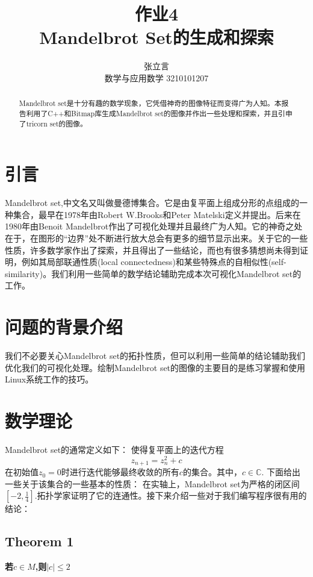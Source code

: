 \documentclass{ctexart}
\begin{document}
\title{作业4\\Mandelbrot Set的生成和探索}
\author{张立言\\数学与应用数学 3210101207}
\maketitle

\begin{abstract}
Mandelbrot set是十分有趣的数学现象，它凭借神奇的图像特征而变得广为人知。本报告利用了C++和Bitmap库生成Mandelbrot set的图像并作出一些处理和探索，并且引申了tricorn set的图像。

\end{abstract}
\section{引言}
Mandelbrot set,中文名又叫做曼德博集合。它是由复平面上组成分形的点组成的一种集合，最早在1978年由Robert W.Brooks和Peter Matelski定义并提出。后来在1980年由Benoit Mandelbrot作出了可视化处理并且最终广为人知\cite{aa}。它的神奇之处在于，在图形的“边界”处不断进行放大总会有更多的细节显示出来。关于它的一些性质，许多数学家作出了探索，并且得出了一些结论，而也有很多猜想尚未得到证明，例如其局部联通性质(local connectedness)和某些特殊点的自相似性(self-similarity)。我们利用一些简单的数学结论辅助完成本次可视化Mandelbrot set的工作。

\section{问题的背景介绍}
我们不必要关心Mandelbrot set的拓扑性质，但可以利用一些简单的结论辅助我们优化我们的可视化处理。绘制Mandelbrot set的图像的主要目的是练习掌握和使用Linux系统工作的技巧。
\section{数学理论}
Mandelbrot set的通常定义如下：
使得复平面上的迭代方程
\begin{equation}
z_{n+1}=z_n^2+c \label{iteq}
\end{equation}
在初始值$z_0=0$时进行迭代能够最终收敛的所有$c$的集合。其中，$c \in \mathbb{C}$.
下面给出一些关于该集合的一些基本的性质：
在实轴上，Mandelbrot set为严格的闭区间$[-2,\frac{1}{4}]$.拓扑学家证明了它的连通性。接下来介绍一些对于我们编写程序很有用的结论：
\subsection{Theorem 1}
\textbf{若$c\in M$,则$|c|\le 2$}
\end{document}
